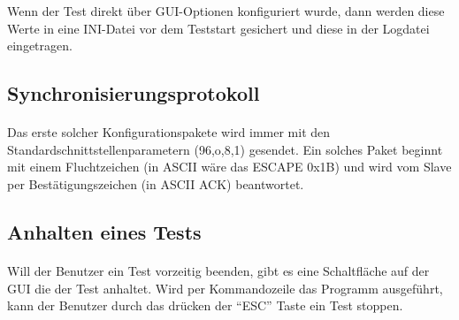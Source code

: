 Wenn der Test direkt über GUI-Optionen konfiguriert wurde, dann werden diese Werte in eine INI-Datei vor dem Teststart gesichert und diese in der Logdatei eingetragen.

\subsection{Synchronisierungsprotokoll}
\paragraph{}
Das erste solcher Konfigurationspakete wird immer mit den Standardschnittstellenparametern (96,o,8,1) gesendet. Ein solches Paket beginnt mit einem Fluchtzeichen (in ASCII wäre das ESCAPE 0x1B) und wird vom Slave per Bestätigungszeichen (in ASCII ACK) beantwortet.


\subsection{Anhalten eines Tests}
\paragraph{}
Will der Benutzer ein Test vorzeitig beenden, gibt es eine Schaltfläche auf der GUI die der Test anhaltet. Wird per Kommandozeile das Programm ausgeführt, kann der Benutzer durch das drücken der "`ESC"' Taste ein Test stoppen.
